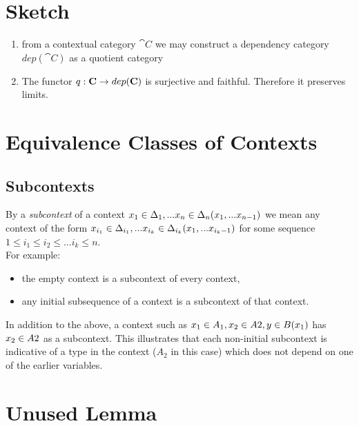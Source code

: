 \documentclass[10pt,a4paper]{scrartcl}
\begin{document}
\newpage

\section{Sketch}
\begin{enumerate}
\item{
from a contextual category $\cat{C}$ we may construct a dependency category $dep(\cat{C})$ as a quotient category
}
\item{
The functor $q:\textbf{C} \rightarrow dep(\textbf{C})$ is surjective and faithful.
Therefore it preserves limits.
}
\end{enumerate}




\section{Equivalence Classes of Contexts}
\subsection{Subcontexts}
By a \textit{subcontext} of a context $x_1 \in \Delta_1,... x_{n} \in \Delta_{n}(x_1,...x_{n-1})$ we mean any context
of the form
$x_{i_1} \in {\Delta}_{i_1},... x_{i_k} \in {\Delta}_{i_k}(x_1,...x_{i_k-1})$ for some sequence 
$1 \leq i_1 \leq i_2 \leq ... i_k \leq n$. \\

\noindent
For example:
\begin {itemize}


\item the empty context  is a subcontext of every 
context,
\item any initial subsequence of a context is a subcontext of that context.
\end{itemize}

\noindent
In addition to the above, a context such as $x_1 \in A_1,x_2 \in A2,y \in B(x_1)$ has 
$x_2 \in A2$ as a subcontext. This illustrates that each non-initial subcontext is indicative of a type in the context ($A_2$ in this case)
which does not depend on one of the earlier variables.
 

\section{Unused Lemma}
\end{document}
